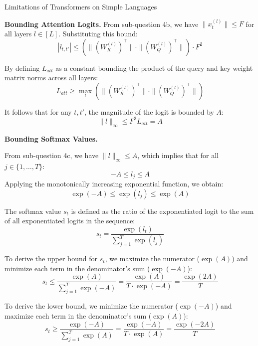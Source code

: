 \begin{question}{Limitations of Transformers on Simple Languages}
\begin{subquestion}{\textbf{Bounding Attention Logits.}}
    From sub-question 4b, we have $\|x_t^{(l)}\| \le F$ for all layers $l \in [L]$. Substituting this bound:
    \begin{equation}
    |l_{t, t'}| \le (\|(W_K^{(l)})^\top\| \cdot \|(W_Q^{(l)})^\top\|) \cdot F^2
    \end{equation}

    By defining $L_{att}$ as a constant bounding the product of the query and key weight matrix norms across all layers:
    \begin{equation}
    L_{att} \ge \max_{l} (\|(W_K^{(l)})^\top\| \cdot \|(W_Q^{(l)})^\top\|)
    \end{equation}

    It follows that for any $t, t'$, the magnitude of the logit is bounded by $A$:
    \begin{equation}
    \|l\|_{\infty} \le F^2 L_{att} = A
    \end{equation}

\end{subquestion}

\begin{subquestion}{\textbf{Bounding Softmax Values.}}

    From sub-question 4c, we have $\|l\|_{\infty} \le A$, which implies that for all $j \in \{1, \dots, T\}$:
    \begin{equation}
    -A \le l_j \le A
    \end{equation}
    Applying the monotonically increasing exponential function, we obtain:
    \begin{equation}
    \exp(-A) \le \exp(l_j) \le \exp(A)
    \end{equation}

    The softmax value $s_t$ is defined as the ratio of the exponentiated logit to the sum of all exponentiated logits in the sequence:
    \begin{equation}
    s_t = \frac{\exp(l_t)}{\sum_{j=1}^T \exp(l_j)}
    \end{equation}

    To derive the upper bound for $s_t$, we maximize the numerator ($\exp(A)$) and minimize each term in the denominator's sum ($\exp(-A)$):
    \begin{equation}
    s_t \le \frac{\exp(A)}{\sum_{j=1}^T \exp(-A)} = \frac{\exp(A)}{T \cdot \exp(-A)} = \frac{\exp(2A)}{T}
    \end{equation}

    To derive the lower bound, we minimize the numerator ($\exp(-A)$) and maximize each term in the denominator's sum ($\exp(A)$):
    \begin{equation}
    s_t \ge \frac{\exp(-A)}{\sum_{j=1}^T \exp(A)} = \frac{\exp(-A)}{T \cdot \exp(A)} = \frac{\exp(-2A)}{T}
    \end{equation}


\end{subquestion}
\end{question}

